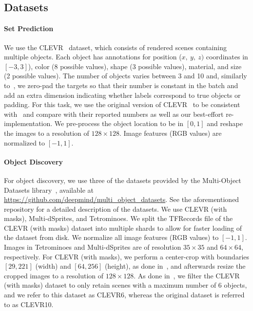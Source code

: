 \documentclass{article}
\begin{document}
\subsection{Datasets}
\label{sec:app_datasets}

\paragraph{Set Prediction}
 We use the CLEVR~\citep{johnson2017clevr} dataset, which consists of rendered scenes containing multiple objects. Each object has annotations for position ($x, \ y, \ z)$ coordinates in $[-3, 3]$), color (\num{8} possible values), shape (\num{3} possible values), material, and size (\num{2} possible values). The number of objects varies between \num{3} and \num{10} and, similarly to~\citep{zhang2019deep}, we zero-pad the targets so that their number is constant in the batch and add an extra dimension indicating whether labels correspond to true objects or padding. For this task, we use the original version of CLEVR~\citep{johnson2017clevr} to be consistent with~\citep{zhang2019deep} and compare with their reported numbers as well as our best-effort re-implementation. We pre-process the object location to be in $[0, 1]$ and reshape the images to a resolution of $128\times128$. Image features (RGB values) are normalized to $[-1, 1]$.

\paragraph{Object Discovery}
For object discovery, we use three of the datasets provided by the Multi-Object Datasets library~\citep{multiobjectdatasets19}, available at \url{https://github.com/deepmind/multi_object_datasets}. See the aforementioned repository for a detailed description of the datasets. We use CLEVR (with masks), Multi-dSprites, and Tetrominoes. We split the TFRecords file of the CLEVR (with masks) dataset into multiple shards to allow for faster loading of the dataset from disk. We normalize all image features (RGB values) to $[-1, 1]$. Images in Tetrominoes and Multi-dSprites are of resolution $35\times35$ and $64\times64$, respectively. For CLEVR (with masks), we perform a center-crop with boundaries $[29, 221]$ (width) and $[64, 256]$ (height), as done in~\citep{greff2019multi}, and afterwards resize the cropped images to a resolution of $128\times128$. As done in~\citep{greff2019multi}, we filter the CLEVR (with masks) dataset to only retain scenes with a maximum number of 6 objects, and we refer to this dataset as CLEVR6, whereas the original dataset is referred to as CLEVR10.
\end{document}
